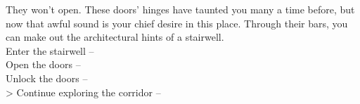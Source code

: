 They won’t open. These doors’ hinges have taunted you many a time before, but now that awful sound is your chief desire in this place. Through their bars, you can make out the architectural hints of a stairwell.\\

 Enter the stairwell -- \\
 Open the doors -- \\
 Unlock the doors --  \\
> Continue exploring the corridor -- 